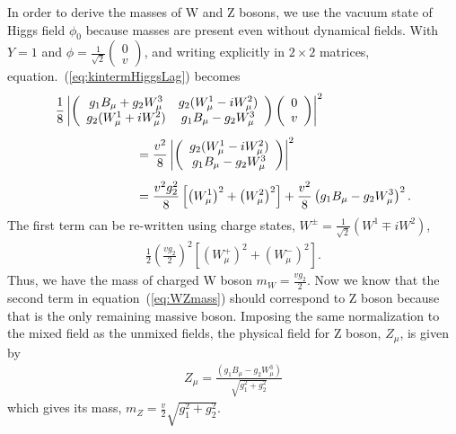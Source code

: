 In order to derive the masses of W and Z bosons, we use the vacuum state of Higgs field $\phi_0$
because masses are present even without dynamical fields.  
With $Y=1$ and $\displaystyle \phi = \frac{1}{\sqrt{2}} 
\left(  \begin{array}{c} 0 \\ v \end{array} \right)$, 
and writing explicitly in $2\times2$ matrices, equation.~(\ref{eq:kintermHiggsLag}) becomes 
\begin{eqnarray}
\label{eq:WZmass}
\begin{array}{ccc} \multicolumn{2}{c}{ \displaystyle \vspace{0.3cm}   
\frac{1}{8} \left| \left(  \begin{array}{cc} 
g_1 B_\mu + g_2 W_\mu^3     & g_2 (W_\mu^1 - iW_\mu^2) \\
g_2 (W_\mu^1 + iW_\mu^2)    & g_1 B_\mu - g_2 W_\mu^3 \end{array} \right) 
\left(  \begin{array}{c} 0 \\ v \end{array} \right) \right|^2 
} & \\ & \multicolumn{2}{l}{\hspace{2cm} \vspace{0.3cm} \displaystyle   
= \frac{v^2}{8} \left| \left(  \begin{array}{c} 
g_2 (W_\mu^1 - iW_\mu^2) \\
g_1 B_\mu - g_2 W_\mu^3 
\end{array} \right) \right|^2} \\  
& \multicolumn{2}{l}{\hspace{2cm}  \displaystyle   
=   
\frac{v^2 g_2^2}{8} \left[ \left( W_\mu^1 \right)^2  + \left( W_\mu^2 \right)^2 \right] 
+ \frac{v^2}{8} \left( g_1 B_\mu - g_2 W_\mu^3 \right)^2.
} \end{array}    
\end{eqnarray} 
The first term can be re-written using charge states, 
$\displaystyle W^\pm = \frac{1}{\sqrt{2}} \left( W^1 \mp iW^2 \right)$, 
\begin{eqnarray}
\frac{1}{2} \left( \frac{v g_2}{2} \right)^2 
\left[ \left( W_\mu^+ \right)^2  + \left( W_\mu^- \right)^2 \right]. 
\end{eqnarray}
Thus, we have the mass of charged W boson $\displaystyle m_W = \frac{v g_2}{2}$.
Now we know that the second term in equation~(\ref{eq:WZmass}) should correspond to 
Z boson because that is the only remaining massive boson. Imposing the same 
normalization to the mixed field as the unmixed fields, the physical field for 
Z boson, $Z_\mu$, is given by
\begin{eqnarray} 
Z_\mu = \frac{\left( g_1 B_\mu - g_2 W_\mu^3 \right)}{\sqrt{g_1^2+g_2^2}}  
\end{eqnarray} 
which gives its mass, $\displaystyle m_Z = \frac{v}{2} \sqrt{g_1^2+g_2^2}$. 

